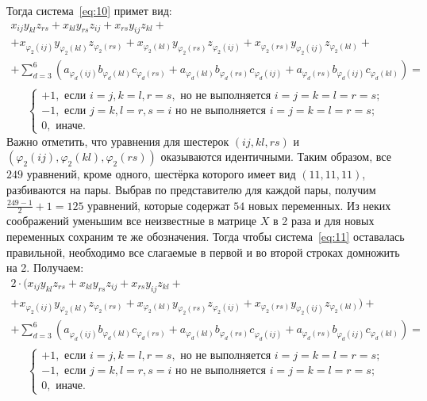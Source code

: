 \documentclass[12pt]{article}
\begin{document}
    Тогда система~\eqref{eq:10} примет вид:
    \begin{gather*}
        x_{ij} y_{kl} z_{rs}+x_{kl} y_{rs} z_{ij}+x_{rs} y_{ij} z_{kl} +\\
        +x_{\varphi_2 (ij)} y_{\varphi_2 (kl)} z_{\varphi_2 (rs)}+x_{\varphi_2 (kl)} y_{\varphi_2 (rs)} z_{\varphi_2 (ij)}+x_{\varphi_2 (rs)} y_{\varphi_2 (ij)} z_{\varphi_2 (kl)} +\\
        +\sum_{d=3}^{6} (a_{\varphi_d (ij)} b_{\varphi_d (kl)} c_{\varphi_d (rs)}+a_{\varphi_d (kl)} b_{\varphi_d (rs)} c_{\varphi_d (ij)}+a_{\varphi_d (rs)} b_{\varphi_d (ij)} c_{\varphi_d (kl)})=\\
    \end{gather*}
    \begin{equation}
        \begin{cases}
            +1, \text{ если } i=j, k=l, r=s,  \text{ но не выполняется } i=j=k=l=r=s;\\
            -1, \text{ если } j=k, l=r, s=i  \text{ но не выполняется } i=j=k=l=r=s;\\
            0, \text{ иначе.}
        \end{cases}\label{eq:11}
    \end{equation}
    Важно отметить, что уравнения для шестерок $(ij, kl, rs)$ и $(\varphi_2 (ij), \varphi_2 (kl), \varphi_2 (rs))$ оказываются идентичными.
    Таким образом, все $ 249 $ уравнений, кроме одного, шестёрка которого имеет вид $ (11, 11, 11) $, разбиваются на пары.
    Выбрав по представителю для каждой пары, получим $ \frac{249 - 1}{2} + 1 = 125 $ уравнений, которые содержат
    $ 54 $ новых переменных.
    Из неких соображений уменьшим все неизвестные в матрице $X$ в 2 раза и для новых переменных сохраним те же обозначения.
    Тогда чтобы система~\eqref{eq:11} оставалась правильной, необходимо все слагаемые в первой и во второй строках домножить на 2.
    Получаем:
    \begin{gather*}
        2 \cdot (x_{ij}y_{kl} z_{rs}+x_{kl} y_{rs} z_{ij}+x_{rs} y_{ij} z_{kl} +\\
        +x_{\varphi_2 (ij)} y_{\varphi_2 (kl)} z_{\varphi_2 (rs)}+x_{\varphi_2 (kl)} y_{\varphi_2 (rs)} z_{\varphi_2 (ij)}+x_{\varphi_2 (rs)} y_{\varphi_2 (ij)} z_{\varphi_2 (kl)}) +\\
        +\sum_{d=3}^{6} (a_{\varphi_d (ij)} b_{\varphi_d (kl)} c_{\varphi_d (rs)}+a_{\varphi_d (kl)} b_{\varphi_d (rs)} c_{\varphi_d (ij)}+a_{\varphi_d (rs)} b_{\varphi_d (ij)} c_{\varphi_d (kl)})=\\
    \end{gather*}
    \begin{equation}
        \begin{cases}
            +1, \text{ если } i=j, k=l, r=s,  \text{ но не выполняется } i=j=k=l=r=s;\\
            -1, \text{ если } j=k, l=r, s=i  \text{ но не выполняется } i=j=k=l=r=s;\\
            0, \text{ иначе.}
        \end{cases}\label{eq:12}
    \end{equation}
\end{document}

